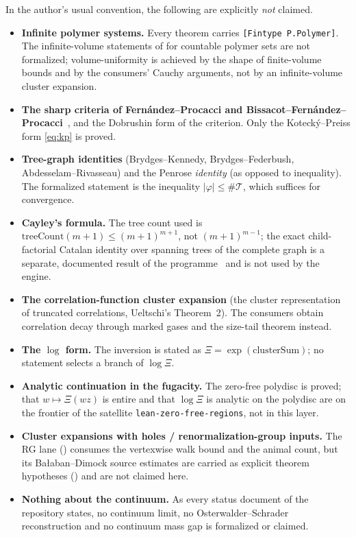 \documentclass[11pt]{article}
\theoremstyle{definition}
\theoremstyle{remark}
\newcommand{\file}[1]{{\normalfont\path{#1}}}
\newcommand{\Ur}{\varphi}
\newcommand{\Trees}{\mathcal{T}}
\begin{document}
In the author's usual convention, the following are explicitly \emph{not}
claimed.
\begin{itemize}
\item \textbf{Infinite polymer systems.}  Every theorem carries
  \texttt{[Fintype P.Polymer]}.  The infinite-volume statements of
  \cite{KoteckyPreiss1986,FriedliVelenik2017} for countable polymer sets are
  not formalized; volume-uniformity is achieved by the shape of finite-volume
  bounds and by the consumers' Cauchy arguments, not by an infinite-volume
  cluster expansion.
\item \textbf{The sharp criteria of Fern\'andez--Procacci and
  Bissacot--Fern\'andez--Procacci}~\cite{FernandezProcacci2007,BFP2010}, and
  the Dobrushin form of the criterion.  Only the Koteck\'y--Preiss form
  \eqref{eq:kp} is proved.
\item \textbf{Tree-graph identities} (Brydges--Kennedy, Brydges--Federbush,
  Abdesselam--Rivasseau) and the Penrose \emph{identity} (as opposed to
  inequality).  The formalized statement is the inequality
  $|\Ur| \le \#\Trees$, which suffices for convergence.
\item \textbf{Cayley's formula.}  The tree count used is
  $\mathrm{treeCount}(m+1) \le (m+1)^{m+1}$, not $(m+1)^{m-1}$; the exact
  child-factorial Catalan identity over spanning trees of the complete graph
  is a separate, documented result of the programme~\cite{Eriksson2026Catalan}
  and is not used by the engine.
\item \textbf{The correlation-function cluster expansion} (the cluster
  representation of truncated correlations, Ueltschi's Theorem~2).  The
  consumers obtain correlation decay through marked gases and the size-tail
  theorem instead.
\item \textbf{The $\log$ form.}  The inversion is stated as
  $\Xi = \exp(\mathrm{clusterSum})$; no statement selects a branch of
  $\log \Xi$.
\item \textbf{Analytic continuation in the fugacity.}  The zero-free polydisc
  is proved; that $w \mapsto \Xi(wz)$ is entire and that $\log \Xi$ is analytic
  on the polydisc are on the frontier of the satellite
  \texttt{lean-zero-free-regions}, not in this layer.
\item \textbf{Cluster expansions with holes / renormalization-group inputs.}
  The RG lane (\file{YangMills/RG/}) consumes the vertexwise walk bound and the
  animal count, but its Ba\l{}aban--Dimock source estimates are carried as
  explicit theorem hypotheses (\file{HYPOTHESIS_FRONTIER.md}) and are not
  claimed here.
\item \textbf{Nothing about the continuum.}  As every status document of the
  repository states, no continuum limit, no Osterwalder--Schrader
  reconstruction and no continuum mass gap is formalized or claimed.
\end{itemize}
\end{document}
